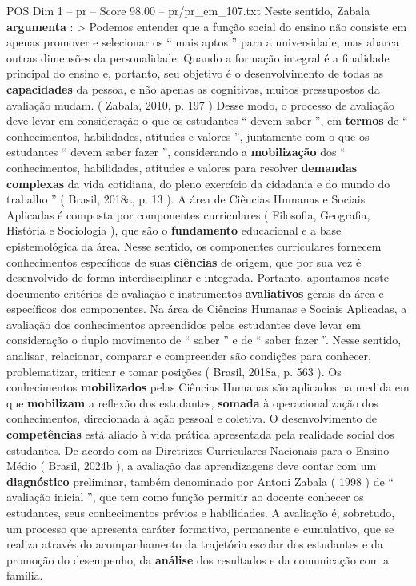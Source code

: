 \begin{textsample}{POS Dim 1 – pr – Score 98.00 – pr/pr\_em\_107.txt}
Neste sentido, Zabala \textbf{argumenta} : > Podemos entender que a função social do ensino não consiste em apenas promover e selecionar os “ mais aptos ” para a universidade, mas abarca outras dimensões da personalidade.
Quando a formação integral é a finalidade principal do ensino e, portanto, seu objetivo é o desenvolvimento de todas as \textbf{capacidades} da pessoa, e não apenas as cognitivas, muitos pressupostos da avaliação mudam. ( Zabala, 2010, p. 197 ) Desse modo, o processo de avaliação deve levar em consideração o que os estudantes “ devem saber ”, em \textbf{termos} de “ conhecimentos, habilidades, atitudes e valores ”, juntamente com o que os estudantes “ devem saber fazer ”, considerando a \textbf{mobilização} dos “ conhecimentos, habilidades, atitudes e valores para resolver \textbf{demandas} \textbf{complexas} da vida cotidiana, do pleno exercício da cidadania e do mundo do trabalho ” ( Brasil, 2018a, p. 13 ).
A área de Ciências Humanas e Sociais Aplicadas é composta por componentes curriculares ( Filosofia, Geografia, História e Sociologia ), que são o \textbf{fundamento} educacional e a base epistemológica da área.
Nesse sentido, os componentes curriculares fornecem conhecimentos específicos de suas \textbf{ciências} de origem, que por sua vez é desenvolvido de forma interdisciplinar e integrada.
Portanto, apontamos neste documento critérios de avaliação e instrumentos \textbf{avaliativos} gerais da área e específicos dos componentes.
Na área de Ciências Humanas e Sociais Aplicadas, a avaliação dos conhecimentos apreendidos pelos estudantes deve levar em consideração o duplo movimento de “ saber ” e de “ saber fazer ”.
Nesse sentido, analisar, relacionar, comparar e compreender são condições para conhecer, problematizar, criticar e tomar posições ( Brasil, 2018a, p. 563 ).
Os conhecimentos \textbf{mobilizados} pelas Ciências Humanas são aplicados na medida em que \textbf{mobilizam} a reflexão dos estudantes, \textbf{somada} à operacionalização dos conhecimentos, direcionada à ação pessoal e coletiva.
O desenvolvimento de \textbf{competências} está aliado à vida prática apresentada pela realidade social dos estudantes.
De acordo com as Diretrizes Curriculares Nacionais para o Ensino Médio ( Brasil, 2024b ), a avaliação das aprendizagens deve contar com um \textbf{diagnóstico} preliminar, também denominado por Antoni Zabala ( 1998 ) de “ avaliação inicial ”, que tem como função permitir ao docente conhecer os estudantes, seus conhecimentos prévios e habilidades.
A avaliação é, sobretudo, um processo que apresenta caráter formativo, permanente e cumulativo, que se realiza através do acompanhamento da trajetória escolar dos estudantes e da promoção do desempenho, da \textbf{análise} dos resultados e da comunicação com a família.

\end{textsample}
